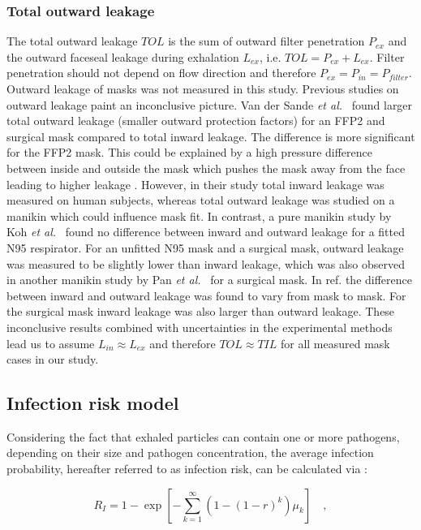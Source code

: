 \documentclass[preprint]{elsarticle}
\begin{document}
\subsubsection{Total outward leakage}
\label{sec:TOL}
The total outward leakage $TOL$ is the sum of outward filter penetration $P_{ex}$ and the outward faceseal leakage during exhalation $L_{ex}$, i.e. $TOL=P_{ex}+L_{ex}$.
Filter penetration should not depend on flow direction and therefore $P_{ex}=P_{in}=P_{filter}$.
Outward leakage of masks was not measured in this study. Previous studies on outward leakage paint an inconclusive picture.
Van der Sande \textit{et al.}\ \cite{van2008professional} found larger total outward leakage (smaller outward protection factors) for an FFP2 and surgical mask compared to total inward leakage. The difference is more significant for the FFP2 mask. This could be explained by a high pressure difference between inside and outside the mask which pushes the mask away from the face leading to higher leakage \cite{mittal2020flow}. However, in their study total inward leakage was measured on human subjects, whereas total outward leakage was studied on a manikin which could influence mask fit.
In contrast, a pure manikin study by Koh \textit{et al.}\ \cite{koh2021outward} found no difference between inward and outward leakage for a fitted N95 respirator. For an unfitted N95 mask and a surgical mask, outward leakage was measured to be slightly lower than inward leakage, which was also observed in another manikin study by Pan \textit{et al.}\ \cite{pan2021inward} for a surgical mask. In ref. \cite{pan2021inward} the difference between inward and outward leakage was found to vary from mask to mask. For the surgical mask inward leakage was also larger than outward leakage.
These inconclusive results combined with uncertainties in the experimental methods lead us to assume $L_{in}\approx L_{ex}$ and therefore $TOL \approx TIL$ for all measured mask cases in our study.


\subsection{Infection risk model}
Considering the fact that exhaled particles can contain one or more pathogens, depending on their size and pathogen concentration, the average infection probability, hereafter referred to as infection risk, can be calculated via \cite{Nordsiek2021}:

\begin{equation}
	R_I =  1 - \exp{\left[-\sum_{k=1}^\infty{\left(1 - (1 - r)^k\right) \mu_k}\right]} \quad ,
	\label{eqn:modified_exponential_model}
\end{equation}
\end{document}
